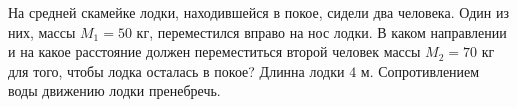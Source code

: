 На средней скамейке лодки, находившейся в покое, сидели два человека.
Один из них, массы $M_1 = 50$ кг, переместился вправо на нос лодки.
В каком направлении и на какое расстояние должен переместиться
второй человек массы $M_2 = 70$ кг для того,
чтобы лодка осталась в покое?
Длинна лодки $4$ м. Сопротивлением воды движению лодки пренебречь.
